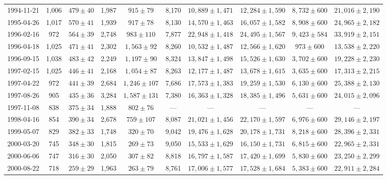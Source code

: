 \begin{landscape}
\begin{longtable}{cccccccccc}
{1994-11-21} & 1,006 & {$479  \pm  40$} & 1,987 & {$915 \pm 79$} & 8,170 & {$10,889 \pm 1,471$} & {$12,284 \pm 1,590$} & {$8,732 \pm 600$} & {$21,016 \pm 2,190$} \\
{1995-04-26} & 1,017 & {$570  \pm  41$} & 1,939 & {$917 \pm 78$} & 8,130 & {$14,570 \pm 1,463$} & {$16,057 \pm 1,582$} & {$8,908 \pm 600$} & {$24,965 \pm 2,182$} \\
{1996-02-16} & 972 & {$564  \pm  39$} & 2,748 & {$983 \pm 110$} & 7,877 & {$22,948 \pm 1,418$} & {$24,495 \pm 1,567$} & {$9,423 \pm 584$} & {$33,919 \pm 2,151$} \\
{1996-04-18} & 1,025 & {$471  \pm  41$} & 2,302 & {$1,563 \pm 92$} & 8,260 & {$10,532 \pm 1,487$} & {$12,566 \pm 1,620$} & {$973 \pm 600$} & {$13,538 \pm 2,220$} \\
{1996-09-15} & 1,038 & {$483  \pm  42$} & 2,249 & {$1,197 \pm 90$} & 8,324 & {$13,847 \pm 1,498$} & {$15,526 \pm 1,630$} & {$3,702 \pm 600$} & {$19,228 \pm 2,230$} \\
{1997-02-15} & 1,025 & {$446  \pm  41$} & 2,168 & {$1,054 \pm 87$} & 8,263 & {$12,177 \pm 1,487$} & {$13,678 \pm 1,615$} & {$3,635 \pm 600$} & {$17,313 \pm 2,215$} \\
{1997-04-22} & 972 & {$441  \pm  39$} & 2,684 & {$1,246 \pm 107$} & 7,686 & {$17,573 \pm 1,383$} & {$19,259 \pm 1,530$} & {$6,130 \pm 600$} & {$25,388 \pm 2,130$} \\
{1997-08-26} & 905 & {$435  \pm  36$} & 3,284 & {$1,587 \pm 131$} & 7,380 & {$16,363 \pm 1,328$} & {$18,385 \pm 1,496$} & {$5,631 \pm 600$} & {$24,015 \pm 2,096$} \\
{1997-11-08} & 838 & {$375  \pm  34$} & 1,888 & {$802 \pm 76$} & --- & --- & --- & --- & --- \\
{1998-04-16} & 854 & {$390  \pm  34$} & 2,678 & {$759 \pm 107$} & 8,087 & {$21,021 \pm 1,456$} & {$22,170 \pm 1,597$} & {$6,976 \pm 600$} & {$29,146 \pm 2,197$} \\
{1999-05-07} & 829 & {$382  \pm  33$} & 1,748 & {$320 \pm 70$} & 9,042 & {$19,476 \pm 1,628$} & {$20,178 \pm 1,731$} & {$8,218 \pm 600$} & {$28,396 \pm 2,331$} \\
{2000-03-20} & 745 & {$348  \pm  30$} & 1,815 & {$269 \pm 73$} & 9,050 & {$15,533 \pm 1,629$} & {$16,150 \pm 1,731$} & {$6,815 \pm 600$} & {$22,965 \pm 2,331$} \\
{2000-06-06} & 747 & {$316  \pm  30$} & 2,050 & {$307 \pm 82$} & 8,818 & {$16,797 \pm 1,587$} & {$17,420 \pm 1,699$} & {$5,830 \pm 600$} & {$23,250 \pm 2,299$} \\
{2000-08-22} & 718 & {$259  \pm  29$} & 1,963 & {$263 \pm 79$} & 8,761 & {$17,006 \pm 1,577$} & {$17,528 \pm 1,684$} & {$5,383 \pm 600$} & {$22,911 \pm 2,284$} \\

\end{longtable}
\end{landscape}
